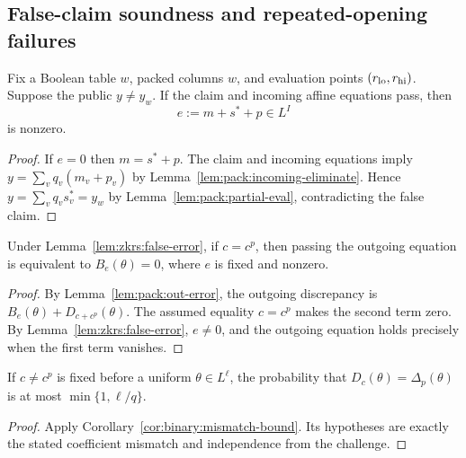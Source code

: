 \subsection{False-claim soundness and repeated-opening failures}\label{sec:zkrs:soundness}

\begin{lemma}\label{lem:zkrs:false-error}
Fix a Boolean table $w$, packed columns $\widehat w$,
and evaluation points $(r_{\rm lo},r_{\rm hi})$.
Suppose the public $y\neq y_w$.
If the claim and incoming affine equations pass,
then
\[
 e:=m+s^*+p\in L^I
\]
is nonzero.
\end{lemma}
\begin{proof}
If $e=0$ then $m=s^*+p$.
The claim and incoming equations imply
$y=\sum_vq_v(m_v+p_v)$ by
Lemma~\ref{lem:pack:incoming-eliminate}.
Hence $y=\sum_vq_vs_v^*=y_w$ by
Lemma~\ref{lem:pack:partial-eval},
contradicting the false claim.
\end{proof}

\begin{lemma}\label{lem:zkrs:correct-c}
Under Lemma~\ref{lem:zkrs:false-error},
if $c=c^p$, then passing the outgoing
equation is equivalent to $B_e(\theta)=0$,
where $e$ is fixed and nonzero.
\end{lemma}
\begin{proof}
By Lemma~\ref{lem:pack:out-error},
the outgoing discrepancy is
$B_e(\theta)+D_{c+c^p}(\theta)$.
The assumed equality $c=c^p$
makes the second term zero.
By Lemma~\ref{lem:zkrs:false-error},
$e\neq0$, and the outgoing
equation holds precisely when
the first term vanishes.
\end{proof}

\begin{lemma}\label{lem:zkrs:incorrect-c}
If $c\neq c^p$ is fixed before a uniform
$\theta\in L^\ell$, the probability that
$D_c(\theta)=\Delta_p(\theta)$ is at most
$\min\{1,\ell/q\}$.
\end{lemma}
\begin{proof}
Apply
Corollary~\ref{cor:binary:mismatch-bound}.
Its hypotheses are exactly the stated
coefficient mismatch and independence
from the challenge.
\end{proof}

